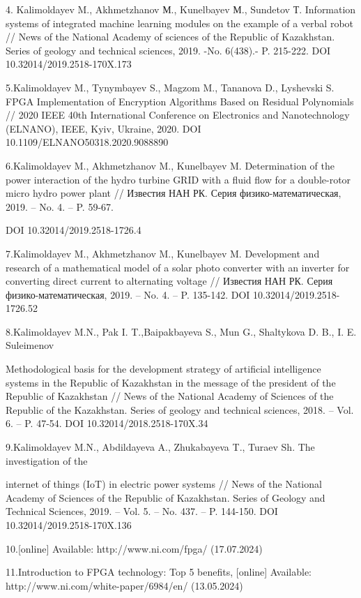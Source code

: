 4. Kalimoldayev M., Akhmetzhanov М., Kunelbayev М., Sundetov Т.
Information systems of integrated machine learning modules on the
example of a verbal robot // News of the National Academy of sciences of
the Republic of Kazakhstan. Series of geology and technical sciences,
2019. -No. 6(438).- P. 215-222. DOI 10.32014/2019.2518-170X.173

5.Kalimoldayev M., Tynymbayev S., Magzom M., Tananova D., Lyshevski S.
FPGA Implementation of Encryption Algorithms Based on Residual
Polynomials // 2020 IEEE 40th International Conference on Electronics
and Nanotechnology (ELNANO), IEEE, Kyiv, Ukraine, 2020. DOI
10.1109/ELNANO50318.2020.9088890

6.Kalimoldayev M., Akhmetzhanov M., Kunelbayev M. Determination of the
power interaction of the hydro turbine GRID with a fluid flow for a
double-rotor micro hydro power plant // Известия НАН РК. Серия
физико-математическая, 2019. -- No. 4. -- P. 59-67.

DOI 10.32014/2019.2518-1726.4

7.Kalimoldayev M., Akhmetzhanov M., Kunelbayev M. Development and
research of a mathematical model of a solar photo converter with an
inverter for converting direct current to alternating voltage //
Известия НАН РК. Серия физико-математическая, 2019. -- No. 4. -- P.
135-142. DOI 10.32014/2019.2518-1726.52

8.Kalimoldayev M.N., Pak I. T.,Baipakbayeva S., Mun G., Shaltykova D.
B., I. E. Suleimenov

Methodological basis for the development strategy of artificial
intelligence systems in the Republic of Kazakhstan in the message of the
president of the Republic of Kazakhstan // News of the National Academy
of Sciences of the Republic of the Kazakhstan. Series of geology and
technical sciences, 2018. -- Vol. 6. -- P. 47-54. DOI
10.32014/2018.2518-170X.34

9.Kalimoldayev M.N., Abdildayeva A., Zhukabayeva T., Turaev Sh. The
investigation of the

internet of things (IoT) in electric power systems // News of the
National Academy of Sciences of the Republic of Kazakhstan. Series of
Geology and Technical Sciences, 2019. -- Vol. 5. -- No. 437. -- P.
144-150. DOI 10.32014/2019.2518-170X.136

10.{[}online{]} Available: http://www.ni.com/fpga/ (17.07.2024)

11.Introduction to FPGA technology: Top 5 benefits, {[}online{]}
Available: http://www.ni.com/white-paper/6984/en/ (13.05.2024)

